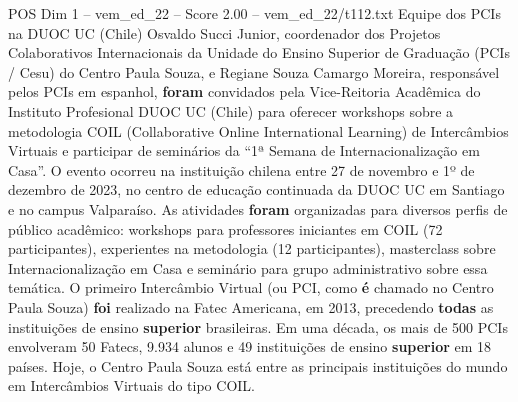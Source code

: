 \begin{textsample}{POS Dim 1 – vem\_ed\_22 – Score 2.00 – vem\_ed\_22/t112.txt}  \label{ex:f1_pos_177}
Equipe dos PCIs na DUOC UC (Chile) Osvaldo Succi Junior, coordenador dos Projetos Colaborativos Internacionais da Unidade do Ensino Superior de Graduação (PCIs / Cesu) do Centro Paula Souza, e Regiane Souza Camargo Moreira, responsável pelos PCIs em espanhol, \textbf{foram} convidados pela Vice-Reitoria Acadêmica do Instituto Profesional DUOC UC (Chile) para oferecer workshops sobre a metodologia COIL (Collaborative Online International Learning) de Intercâmbios Virtuais e participar de seminários da “1ª Semana de Internacionalização em Casa”.
O evento ocorreu na instituição chilena entre 27 de novembro e 1º de dezembro de 2023, no centro de educação continuada da DUOC UC em Santiago e no campus Valparaíso.
As atividades \textbf{foram} organizadas para diversos perfis de público acadêmico: workshops para professores iniciantes em COIL (72 participantes), experientes na metodologia (12 participantes), masterclass sobre Internacionalização em Casa e seminário para grupo administrativo sobre essa temática.
O primeiro Intercâmbio Virtual (ou PCI, como \textbf{é} chamado no Centro Paula Souza) \textbf{foi} realizado na Fatec Americana, em 2013, precedendo \textbf{todas} as instituições de ensino \textbf{superior} brasileiras.
Em uma década, os mais de 500 PCIs envolveram 50 Fatecs, 9.934 alunos e 49 instituições de ensino \textbf{superior} em 18 países.
Hoje, o Centro Paula Souza está entre as principais instituições do mundo em Intercâmbios Virtuais do tipo COIL.

\end{textsample}
